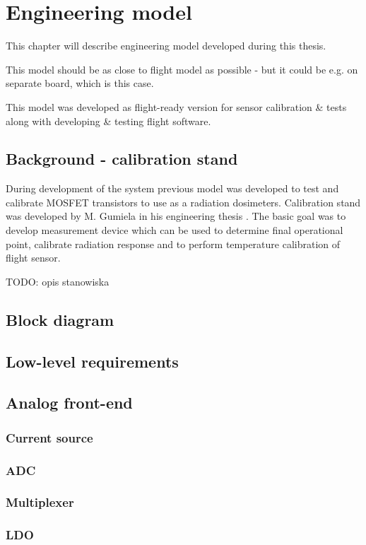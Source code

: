 \chapter{Engineering model}
This chapter will describe engineering model developed during this thesis.

This model should be as close to flight model as possible - but it could be e.g. on separate board, which is this case.

This model was developed as flight-ready version for sensor calibration \& tests along with developing \& testing flight software.

\section{Background - calibration stand}
    During development of the system previous model was developed to test and calibrate MOSFET transistors to use as a radiation dosimeters. Calibration stand was developed by M. Gumiela in his engineering thesis \cite{MGThesis}. The basic goal was to develop measurement device which can be used to determine final operational point, calibrate radiation response and to perform temperature calibration of flight sensor.
    
    TODO: opis stanowiska

\section{Block diagram}

\section{Low-level requirements}

\section{Analog front-end}
\subsection{Current source}
\subsection{ADC}
\subsection{Multiplexer}
\subsection{LDO}
